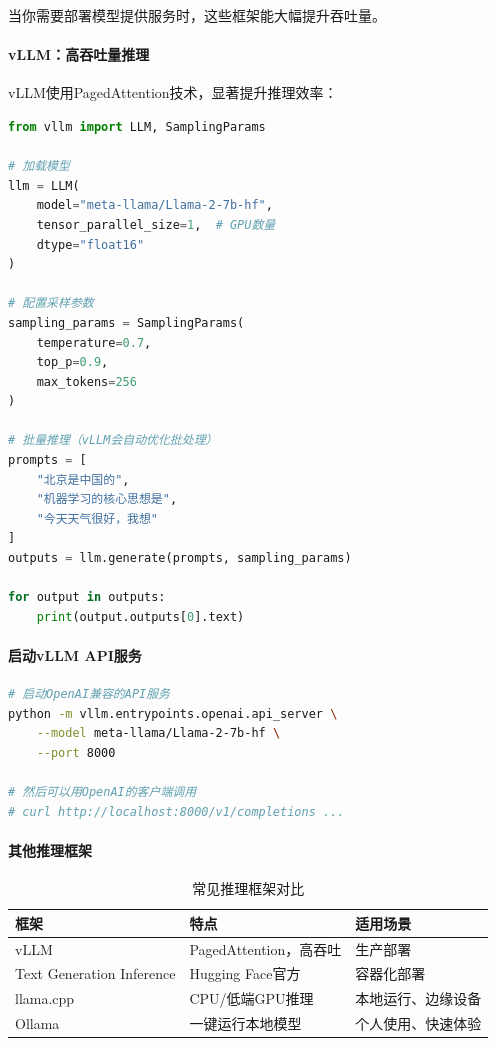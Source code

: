 当你需要部署模型提供服务时，这些框架能大幅提升吞吐量。

\paragraph{vLLM：高吞吐量推理}

vLLM使用PagedAttention技术，显著提升推理效率：

\begin{lstlisting}[language=Python, caption=使用vLLM进行高效推理]
from vllm import LLM, SamplingParams

# 加载模型
llm = LLM(
    model="meta-llama/Llama-2-7b-hf",
    tensor_parallel_size=1,  # GPU数量
    dtype="float16"
)

# 配置采样参数
sampling_params = SamplingParams(
    temperature=0.7,
    top_p=0.9,
    max_tokens=256
)

# 批量推理（vLLM会自动优化批处理）
prompts = [
    "北京是中国的",
    "机器学习的核心思想是",
    "今天天气很好，我想"
]
outputs = llm.generate(prompts, sampling_params)

for output in outputs:
    print(output.outputs[0].text)
\end{lstlisting}

\paragraph{启动vLLM API服务}\mbox{}\par\nopagebreak

\begin{lstlisting}[language=bash, caption=启动vLLM服务器]
# 启动OpenAI兼容的API服务
python -m vllm.entrypoints.openai.api_server \
    --model meta-llama/Llama-2-7b-hf \
    --port 8000

# 然后可以用OpenAI的客户端调用
# curl http://localhost:8000/v1/completions ...
\end{lstlisting}

\paragraph{其他推理框架}\mbox{}\par\nopagebreak

\begin{table}[H]
\centering
\small
\renewcommand{\arraystretch}{1.3}
\begin{tabular}{l|l|l}
\toprule
\textbf{框架} & \textbf{特点} & \textbf{适用场景} \\
\midrule
vLLM & PagedAttention，高吞吐 & 生产部署 \\
Text Generation Inference & Hugging Face官方 & 容器化部署 \\
llama.cpp & CPU/低端GPU推理 & 本地运行、边缘设备 \\
Ollama & 一键运行本地模型 & 个人使用、快速体验 \\
\bottomrule
\end{tabular}
\caption{常见推理框架对比}
\end{table}

